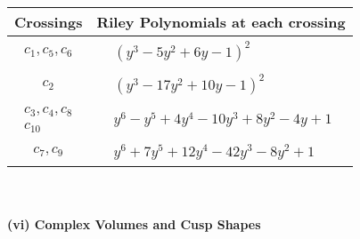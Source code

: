 \documentclass[1p]{elsarticle_modified}
\theoremstyle{definition}
\begin{document}
\begin{tabular}{m{50pt}|m{274pt}}
Crossings & \hspace{64pt}Riley Polynomials at each crossing \\
\hline $$\begin{aligned}c_{1},c_{5},c_{6}\end{aligned}$$&$\begin{aligned}
&(y^3-5 y^2+6 y-1)^2
\end{aligned}$\\
\hline $$\begin{aligned}c_{2}\end{aligned}$$&$\begin{aligned}
&(y^3-17 y^2+10 y-1)^2
\end{aligned}$\\
\hline $$\begin{aligned}c_{3},c_{4},c_{8}\\c_{10}\end{aligned}$$&$\begin{aligned}
&y^6- y^5+4 y^4-10 y^3+8 y^2-4 y+1
\end{aligned}$\\
\hline $$\begin{aligned}c_{7},c_{9}\end{aligned}$$&$\begin{aligned}
&y^6+7 y^5+12 y^4-42 y^3-8 y^2+1
\end{aligned}$\\
\hline
\end{tabular}\\~\\
\newpage\flushleft \textbf{(vi) Complex Volumes and Cusp Shapes}
\end{document}
